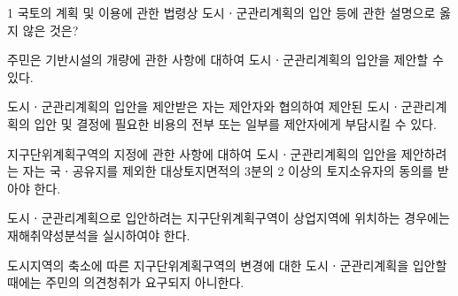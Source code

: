 \begin{question}{1}
국토의 계획 및 이용에 관한 법령상 도시ㆍ군관리계획의 입안 등에 관한 설명으로 옳지 않은 것은?
\begin{choices}
  \item 주민은 기반시설의 개량에 관한 사항에 대하여 도시ㆍ군관리계획의 입안을 제안할 수 있다.
  \item 도시ㆍ군관리계획의 입안을 제안받은 자는 제안자와 협의하여 제안된 도시ㆍ군관리계획의 입안 및 결정에 필요한 비용의 전부 또는 일부를 제안자에게 부담시킬 수 있다.
  \item 지구단위계획구역의 지정에 관한 사항에 대하여 도시ㆍ군관리계획의 입안을 제안하려는 자는 국ㆍ공유지를 제외한 대상토지면적의 3분의 2 이상의 토지소유자의 동의를 받아야 한다.
  \item 도시ㆍ군관리계획으로 입안하려는 지구단위계획구역이 상업지역에 위치하는 경우에는 재해취약성분석을 실시하여야 한다.
  \item 도시지역의 축소에 따른 지구단위계획구역의 변경에 대한 도시ㆍ군관리계획을 입안할 때에는 주민의 의견청취가 요구되지 아니한다.
\end{choices}
\end{question}

